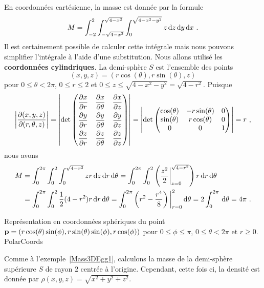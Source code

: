 {\begin{egg}
En coordonnées cartésienne, la masse est donnée par la formule
\[
  M = \int_{-2}^2 \int_{-\sqrt{4-x^2}}^{\sqrt{4-x^2}}
  \int_0^{\sqrt{4-x^2-y^2}} z \,\mathrm{d}z \,\mathrm{d}y \,\mathrm{d}x \ .
\]
Il est certainement possible de calculer cette intégrale mais nous pouvons
simplifier l'intégrale à l'aide d'une substitution.  Nous allons
utilisé les {\bfseries coordonnées cylindriques}.  La demi-sphère $S$ est l'ensemble des points
\[
  (x,y,z) = (r \cos(\theta), r\sin(\theta), z)
\]
pour $0 \leq \theta < 2\pi$, $0 \leq r \leq 2$ et
$ 0 \leq z \leq \sqrt{4-x^2-y^2} = \sqrt{4-r^2}$.
Puisque
\[
\left| \frac{\partial(x,y,z)}{\partial(r,\theta,z)} \right| = 
\left| \det \begin{pmatrix}
  \displaystyle \frac{\partial x}{\partial r} & \displaystyle \frac{\partial x}{\partial \theta}
  & \displaystyle \frac{\partial x}{\partial z} \\[0.8em]
  \displaystyle \frac{\partial y}{\partial r} & \displaystyle \frac{\partial y}{\partial \theta}
  & \displaystyle \frac{\partial y}{\partial z} \\[0.8em]
  \displaystyle \frac{\partial z}{\partial r} & \displaystyle \frac{\partial z}{\partial \theta}
  & \displaystyle \frac{\partial z}{\partial z}
\end{pmatrix} \right|
= \left| \det \begin{pmatrix}
  \cos(\theta) & -r \sin(\theta) & 0 \\
  \sin(\theta) & r \cos(\theta) & 0 \\
  0 & 0  & 1
\end{pmatrix} \right|
= r \ ,
\]
nous avons
\begin{align*}
M &= \int_0^{2\pi} \int_0^2 \int_0^{\sqrt{4-r^2}} z r \,\mathrm{d}z \,\mathrm{d}r \,\mathrm{d}\theta
= \int_0^{2\pi} \int_0^2
\left( \frac{z^2}{2} \bigg|_{z=0}^{\sqrt{4-r^2}} \right) r \,\mathrm{d}r \,\mathrm{d}\theta \\
& = \int_0^{2\pi} \int_0^2 \frac{1}{2} (4-r^2) r \,\mathrm{d}r \,\mathrm{d}\theta
= \int_0^{2\pi} \left( r^2 - \frac{r^4}{8} \right)\bigg|_{r=0}^{2} \,\mathrm{d}\theta
= 2 \int_0^{2\pi} \,\mathrm{d}\theta = 4 \pi \ .
\end{align*}
\label{Mass3DEgg1}
\end{egg}

{Représentation en coordonnées sphériques du point
$\mathbf{p} = (r\cos(\theta)\sin(\phi), r\sin(\theta)\sin(\phi), r\cos(\phi))$
pour $0 \leq \phi \leq \pi$, $0 \leq \theta < 2\pi$ et $r \geq 0$.}
{PolarCoords}

\begin{egg}
Comme à l'exemple~\ref{Mass3DEgg1}, calculons la masse de la
demi-sphère supérieure $S$ de rayon $2$ centrée à l'origine.
Cependant, cette fois ci, la densité est donnée par
$\rho(x,y,z) = \sqrt{x^2+y^2+z^2}$.


\end{egg}}
